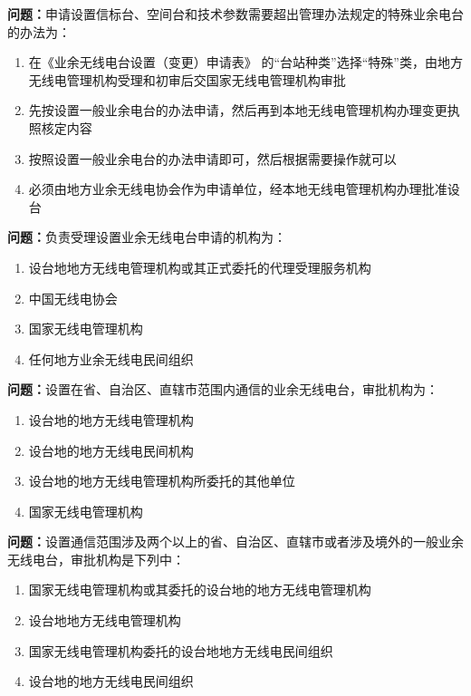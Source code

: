\documentclass[UTF8]{ctexbook}
\begin{document}
\textbf{问题：}申请设置信标台、空间台和技术参数需要超出管理办法规定的特殊业余电台的办法为：
\begin{enumerate}[label=\Alph*), leftmargin=3em]
  \item 在《业余无线电台设置（变更）申请表》 的“台站种类”选择“特殊”类，由地方无线电管理机构受理和初审后交国家无线电管理机构审批
  \item 先按设置一般业余电台的办法申请，然后再到本地无线电管理机构办理变更执照核定内容
  \item 按照设置一般业余电台的办法申请即可，然后根据需要操作就可以
  \item 必须由地方业余无线电协会作为申请单位，经本地无线电管理机构办理批准设台
\end{enumerate}

\textbf{问题：}负责受理设置业余无线电台申请的机构为：
\begin{enumerate}[label=\Alph*), leftmargin=3em]
  \item 设台地地方无线电管理机构或其正式委托的代理受理服务机构
  \item 中国无线电协会
  \item 国家无线电管理机构
  \item 任何地方业余无线电民间组织
\end{enumerate}

\textbf{问题：}设置在省、自治区、直辖市范围内通信的业余无线电台，审批机构为：
\begin{enumerate}[label=\Alph*), leftmargin=3em]
  \item 设台地的地方无线电管理机构
  \item 设台地的地方无线电民间机构
  \item 设台地的地方无线电管理机构所委托的其他单位
  \item 国家无线电管理机构
\end{enumerate}

\textbf{问题：}设置通信范围涉及两个以上的省、自治区、直辖市或者涉及境外的一般业余无线电台，审批机构是下列中：
\begin{enumerate}[label=\Alph*), leftmargin=3em]
  \item 国家无线电管理机构或其委托的设台地的地方无线电管理机构
  \item 设台地地方无线电管理机构
  \item 国家无线电管理机构委托的设台地地方无线电民间组织
  \item 设台地的地方无线电民间组织
\end{enumerate}
\end{document}
